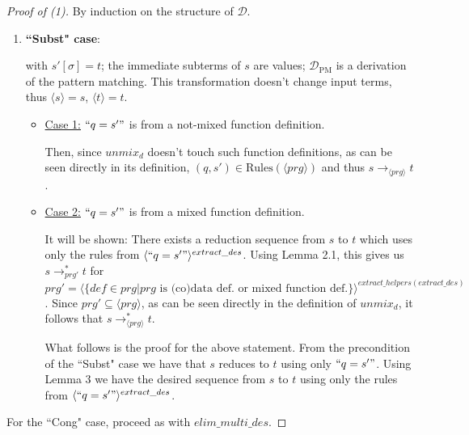 \documentclass[11pt]{article} %
\begin{document}
\begin{proof}[Proof of (1)] By induction on the structure of $\mathcal{D}$.

\begin{enumerate}

\item \textbf{``Subst" case}:

\begin{prooftree}
\end{prooftree}

with $s'[\sigma] = t$; the immediate subterms of $s$ are values; $\mathcal{D}_{\textrm{PM}}$ is a derivation of the pattern matching. This transformation doesn't change input terms, thus $\langle s \rangle = s$, $\langle t \rangle = t$.

\begin{itemize}

\item \underline{Case 1:} $`` q = s' "$ is from a not-mixed function definition.

Then, since $unmix_d$ doesn't touch such function definitions, as can be seen directly in its definition, $(q, s') \in \textrm{Rules}(\langle prg \rangle)$ and thus $s \longrightarrow_{\langle prg \rangle} t$.

\item \underline{Case 2:} $`` q = s' "$ is from a mixed function definition.

It will be shown: There exists a reduction sequence from $s$ to $t$ which uses only the rules from $\langle `` q = s' " \rangle^{extract\_des}$. Using Lemma 2.1, this gives us $s \longrightarrow^*_{prg'} t$ for $prg' = \langle \{ def \in prg | prg \textrm{ is (co)data def. or mixed function def.} \} \rangle^{extract\_helpers(extract\_des)}$. Since $prg' \subseteq \langle prg \rangle$, as can be seen directly in the definition of $unmix_d$, it follows that $s \longrightarrow^*_{\langle prg \rangle} t$.

What follows is the proof for the above statement. From the precondition of the ``Subst" case we have that $s$ reduces to $t$ using only $`` q = s' "$. Using Lemma 3 we have the desired sequence from $s$ to $t$ using only the rules from $\langle `` q = s' " \rangle^{extract\_des}$.

\end{itemize}

\end{enumerate}

For the ``Cong" case, proceed as with $elim\_multi\_des$.

\end{proof}
\end{document}
